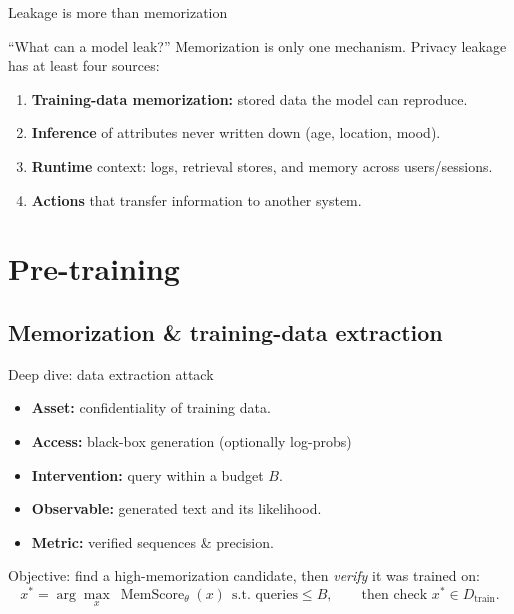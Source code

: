 \documentclass[12pt,aspectratio=169,handout]{beamer}
\begin{document}
\begin{frame}{Leakage is more than memorization}
``What can a model leak?'' Memorization is only one mechanism. Privacy leakage has at least four sources:

\begin{enumerate}
	\setlength{\itemsep}{0.15em}
	\item \textbf{Training-data memorization:} stored data the model can reproduce.
	\item \textbf{Inference} of attributes never written down (age, location, mood).
	\item \textbf{Runtime} context: logs, retrieval stores, and memory across users/sessions.
	\item \textbf{Actions} that transfer information to another system.
\end{enumerate}

\end{frame}


\section{Pre-training}


\subsection{Memorization \& training-data extraction}

\begin{frame}{Deep dive: data extraction attack}

\begin{itemize}\small
	\setlength{\itemsep}{0.15em}
	\item \textbf{Asset:} confidentiality of training data.
	\item \textbf{Access:} black-box generation (optionally log-probs)
	\item \textbf{Intervention:} query within a budget $B$.
	\item \textbf{Observable:} generated text and its likelihood.
	\item \textbf{Metric:} verified sequences \& precision.
\end{itemize}

\vspace{0.2em}
Objective: find a high-memorization candidate, then \emph{verify} it was trained on:
\[
	x^{*} = \arg\max_{x}\ \operatorname{MemScore}_\theta(x)\ \ \text{s.t. queries}\le B,\qquad \text{then check } x^{*}\in D_{\text{train}}.
\]
\end{frame}
\end{document}
